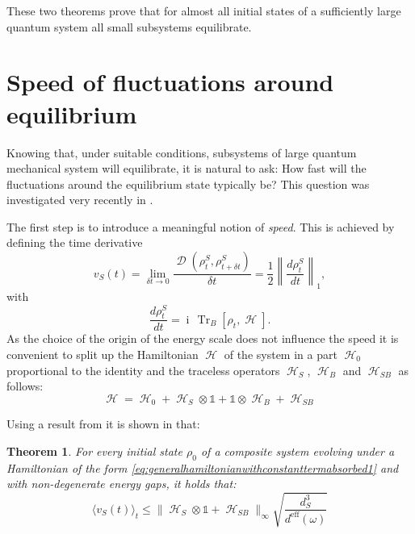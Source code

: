 \documentclass[aps,prl,twocolumn,showpacs,showkeys,a4paper]{revtex4}
\newtheorem{theorem}{Theorem}
\DeclareMathOperator{\Tr}{\mathrm{Tr}}%
\DeclareMathOperator{\tracedistance}{\mathcal{D}}
\DeclareMathOperator{\iu}{\mathrm{i}}%
\DeclareMathOperator{\haH}{\mathscr{H}}%
\newcommand{\expect}[1]{\langle #1\rangle}
\begin{document}
These two theorems prove that for almost all initial states of a sufficiently large quantum system all small subsystems equilibrate.


\section{Speed of fluctuations around equilibrium}
\label{sec:speedoffluctuationsaroudequilibrium}
%
Knowing that, under suitable conditions, subsystems of large quantum mechanical system will equilibrate, it is natural to ask: How fast will the fluctuations around the equilibrium state typically be? 
This question was investigated very recently in \cite{0907.1267v1}.

The first step is to introduce a meaningful notion of \emph{speed}.
This is achieved by defining the time derivative \cite{0907.1267v1}
\begin{equation}
  v_S(t) = \lim_{\delta t \to 0} \frac{\tracedistance(\rho^S_t,\rho^S_{t+\delta t})}{\delta t} = \frac{1}{2} \left\| \frac{d\rho^S_t}{dt} \right\|_1 ,
\end{equation}
with 
\begin{equation}
  \frac{d\rho^S_t}{dt} = \iu\,\Tr_B[\rho_t,\haH] .
\end{equation}
As the choice of the origin of the energy scale does not influence the speed it is convenient to split up the Hamiltonian $\haH$ of the system in a part $\haH_0$ proportional to the identity and the traceless operators $\haH_S$, $\haH_B$ and $\haH_{SB}$ as follows:
\begin{equation}
  \label{eq:generalhamiltonianwithconstanttermabsorbed1}
  \haH = \haH_0 + \haH_S \otimes \mathds{1} + \mathds{1} \otimes \haH_B + \haH_{SB}
\end{equation}

Using a result from \cite{Reimann08} it is shown in \cite{0907.1267v1} that:
\begin{theorem}
  \label{theorem:averagespeedisslow}
  {\bf \cite{0907.1267v1}}
  For every initial state $\rho_0$ of a composite system evolving under a Hamiltonian of the form \eqref{eq:generalhamiltonianwithconstanttermabsorbed1} and with non-degenerate energy gaps, it holds that:
  \begin{equation}
    \expect{v_S(t)}_t \leq \| \haH_S \otimes \mathds{1} + \haH_{SB}\|_\infty \sqrt{\frac{d_S^3}{d^{\mathrm{eff}}(\omega)}}
    \end{equation}
\end{theorem}
\end{document}
